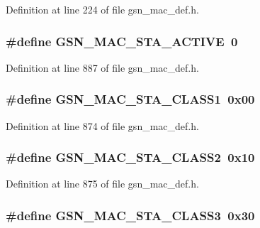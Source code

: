 Definition at line 224 of file gsn\_\-mac\_\-def.h.

\hypertarget{a00642_gaa20efb0a2c9950b1601e9a681c9372be}{
\subsubsection[{GSN\_\-MAC\_\-STA\_\-ACTIVE}]{\setlength{\rightskip}{0pt plus 5cm}\#define GSN\_\-MAC\_\-STA\_\-ACTIVE~0}}
\label{a00642_gaa20efb0a2c9950b1601e9a681c9372be}


Definition at line 887 of file gsn\_\-mac\_\-def.h.

\hypertarget{a00642_gaf0688616f5b52712d7fbc5f2a10896c1}{
\subsubsection[{GSN\_\-MAC\_\-STA\_\-CLASS1}]{\setlength{\rightskip}{0pt plus 5cm}\#define GSN\_\-MAC\_\-STA\_\-CLASS1~0x00}}
\label{a00642_gaf0688616f5b52712d7fbc5f2a10896c1}


Definition at line 874 of file gsn\_\-mac\_\-def.h.

\hypertarget{a00642_ga0127205e69cce6c11a8b87d6562c5623}{
\subsubsection[{GSN\_\-MAC\_\-STA\_\-CLASS2}]{\setlength{\rightskip}{0pt plus 5cm}\#define GSN\_\-MAC\_\-STA\_\-CLASS2~0x10}}
\label{a00642_ga0127205e69cce6c11a8b87d6562c5623}


Definition at line 875 of file gsn\_\-mac\_\-def.h.

\hypertarget{a00642_ga0da606a37b3024d9bf42760219f526be}{
\subsubsection[{GSN\_\-MAC\_\-STA\_\-CLASS3}]{\setlength{\rightskip}{0pt plus 5cm}\#define GSN\_\-MAC\_\-STA\_\-CLASS3~0x30}}
\label{a00642_ga0da606a37b3024d9bf42760219f526be}


